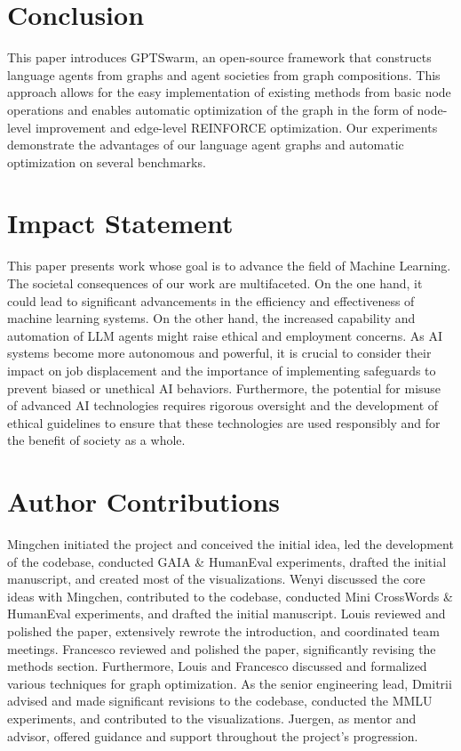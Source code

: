 \documentclass{article}
\theoremstyle{plain}
\theoremstyle{definition}
\theoremstyle{remark}
\begin{document}
\section{Conclusion}
This paper introduces GPTSwarm, an open-source framework that constructs language agents from graphs and agent societies from graph compositions.
This approach allows for the easy implementation of existing methods from basic node operations and enables automatic optimization of the graph in the form of node-level improvement and edge-level REINFORCE optimization.
Our experiments demonstrate the advantages of our language agent graphs and automatic optimization on several benchmarks.

\section*{Impact Statement}
This paper presents work whose goal is to advance the field of Machine Learning.
The societal consequences of our work are multifaceted.
On the one hand, it could lead to significant advancements in the efficiency and effectiveness of machine learning systems.
On the other hand, the increased capability and automation of LLM agents might raise ethical and employment concerns.
As AI systems become more autonomous and powerful, it is crucial to consider their impact on job displacement and the importance of implementing safeguards to prevent biased or unethical AI behaviors.
Furthermore, the potential for misuse of advanced AI technologies requires rigorous oversight and the development of ethical guidelines to ensure that these technologies are used responsibly and for the benefit of society as a whole.

\section*{Author Contributions}
Mingchen initiated the project and conceived the initial idea, led the development of the codebase, conducted GAIA \& HumanEval experiments, drafted the initial manuscript, and created most of the visualizations.
Wenyi discussed the core ideas with Mingchen, contributed to the codebase, conducted Mini CrossWords \& HumanEval experiments, and drafted the initial manuscript.
Louis reviewed and polished the paper, extensively rewrote the introduction, and coordinated team meetings.
Francesco reviewed and polished the paper, significantly revising the methods section.
Furthermore, Louis and Francesco discussed and formalized various techniques for graph optimization.
As the senior engineering lead, Dmitrii advised and made significant revisions to the codebase, conducted the MMLU experiments, and contributed to the visualizations.
Juergen, as mentor and advisor, offered guidance and support throughout the project's progression.
\end{document}
